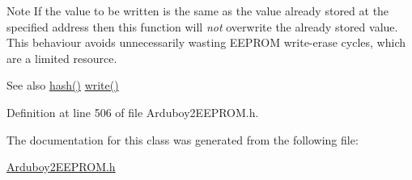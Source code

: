 \begin{DoxyNote}{Note}
If the value to be written is the same as the value already stored at the specified address then this function will {\itshape not} overwrite the already stored value. This behaviour avoids unnecessarily wasting E\+E\+P\+R\+OM write-\/erase cycles, which are a limited resource.
\end{DoxyNote}
\begin{DoxySeeAlso}{See also}
\mbox{\hyperlink{classArduboy2EEPROM_a0d81ac363020a75a0b56af7eb014f5b4}{hash()}} \mbox{\hyperlink{classArduboy2EEPROM_abf7be1f27f4815de59257210dac8c9eb}{write()}} 
\end{DoxySeeAlso}


Definition at line 506 of file Arduboy2\+E\+E\+P\+R\+O\+M.\+h.



The documentation for this class was generated from the following file\+:\begin{DoxyCompactItemize}
\item 
\mbox{\hyperlink{Arduboy2EEPROM_8h}{Arduboy2\+E\+E\+P\+R\+O\+M.\+h}}\end{DoxyCompactItemize}
